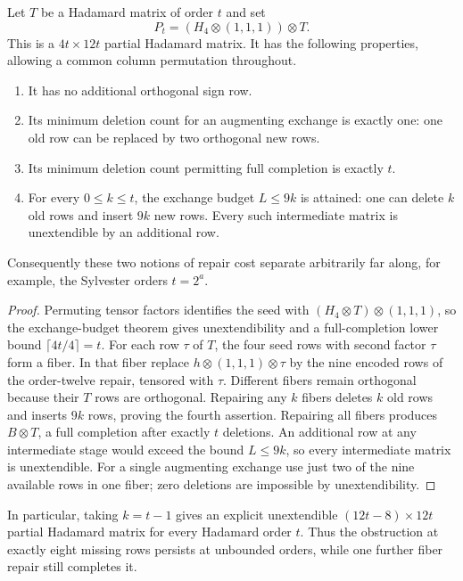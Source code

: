 \begin{theorem}
Let $T$ be a Hadamard matrix of order $t$ and set
\[
 P_t=(H_4\otimes(1,1,1))\otimes T.
\]
This is a $4t\times12t$ partial Hadamard matrix. It has the following
properties, allowing a common column permutation throughout.
\begin{enumerate}
\item It has no additional orthogonal sign row.
\item Its minimum deletion count for an augmenting exchange is exactly
one: one old row can be replaced by two orthogonal new rows.
\item Its minimum deletion count permitting full completion is exactly
$t$.
\item For every $0\le k\le t$, the exchange budget $L\le9k$ is
attained: one can delete $k$ old rows and insert $9k$ new rows.
Every such intermediate matrix is unextendible by an additional row.
\end{enumerate}
Consequently these two notions of repair cost separate arbitrarily
far along, for example, the Sylvester orders $t=2^a$.
\end{theorem}
\begin{proof}
Permuting tensor factors identifies the seed with
$(H_4\otimes T)\otimes(1,1,1)$, so the exchange-budget theorem gives
unextendibility and a full-completion lower bound
$\lceil4t/4\rceil=t$.
For each row $\tau$ of $T$, the four seed rows with second factor
$\tau$ form a fiber. In that fiber replace $h\otimes(1,1,1)\otimes\tau$
by the nine encoded rows of the order-twelve repair, tensored with
$\tau$. Different fibers remain orthogonal because their $T$ rows
are orthogonal. Repairing any $k$ fibers deletes $k$ old rows and
inserts $9k$ rows, proving the fourth assertion. Repairing all fibers
produces $B\otimes T$, a full completion after exactly $t$ deletions.
An additional row at any intermediate stage would exceed the bound
$L\le9k$, so every intermediate matrix is unextendible.
For a single augmenting exchange use just two of the nine available
rows in one fiber; zero deletions are impossible by unextendibility.
\end{proof}

In particular, taking $k=t-1$ gives an explicit unextendible
$(12t-8)\times12t$ partial Hadamard matrix for every Hadamard order
$t$. Thus the obstruction at exactly eight missing rows persists at
unbounded orders, while one further fiber repair still completes it.

